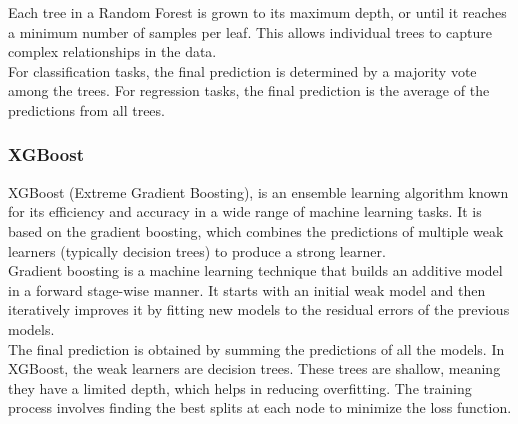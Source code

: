 Each tree in a Random Forest is grown to its maximum depth, or until it reaches a minimum number of samples per leaf. This allows individual trees to capture complex relationships in the data.\\

For classification tasks, the final prediction is determined by a majority vote among the trees. For regression tasks, the final prediction is the average of the predictions from all trees.

\subsubsection{XGBoost}


XGBoost (Extreme Gradient Boosting), is an ensemble learning algorithm known for its efficiency and accuracy in a wide range of machine learning tasks. It is based on the gradient boosting, which combines the predictions of multiple weak learners (typically decision trees) to produce a strong learner. \\

Gradient boosting is a machine learning technique that builds an additive model in a forward stage-wise manner. It starts with an initial weak model and then iteratively improves it by fitting new models to the residual errors of the previous models. \\

The final prediction is obtained by summing the predictions of all the models. In XGBoost, the weak learners are decision trees. These trees are shallow, meaning they have a limited depth, which helps in reducing overfitting. The training process involves finding the best splits at each node to minimize the loss function.






